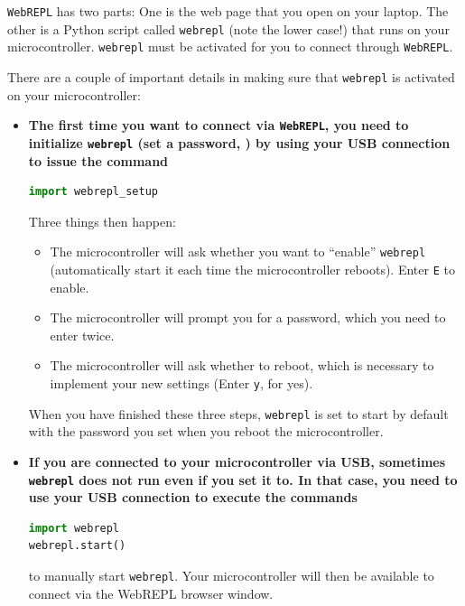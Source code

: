
\begin{kaobox}[frametitle=Making sure \texttt{webrepl} is active on your microcontroller \dots]
\texttt{WebREPL} has two parts: 
One is the web page that you open on your laptop. 
The other is a Python script called \texttt{webrepl} (note the lower case!) that runs on your microcontroller.
\texttt{webrepl} must be activated for you to connect through \texttt{WebREPL}. 
	
There are a couple of important details in making sure that \texttt{webrepl} is activated on your microcontroller:
\begin{itemize}
\item \textbf{The first time you want to connect via \texttt{WebREPL}, you need to initialize \texttt{webrepl} (set a password, \etc) by using your USB connection to issue the command}
\begin{lstlisting}[language=Python]
import webrepl_setup
\end{lstlisting}
Three things then happen:
\begin{itemize}
	\item The microcontroller will ask whether you want to ``enable'' \texttt{webrepl} (automatically start it each time the microcontroller reboots). Enter \texttt{E} to enable.
	\item The microcontroller will prompt you for a password, which you need to enter twice. 
	\item The microcontroller will ask whether to reboot, which is necessary to implement your new settings (Enter \texttt{y}, for yes).
\end{itemize}
When you have finished these three steps, \texttt{webrepl} is set to start by default with the password you set when you reboot the microcontroller.

\item \textbf{If you are connected to your microcontroller via USB, sometimes \texttt{webrepl} does not run even if you set it to. In that case, you need to use your USB connection to execute the commands}
\begin{lstlisting}[language=Python]
import webrepl
webrepl.start()
\end{lstlisting}
to manually start \texttt{webrepl}. Your microcontroller will then be available to connect via the WebREPL browser window.
\end{itemize}
\end{kaobox}

